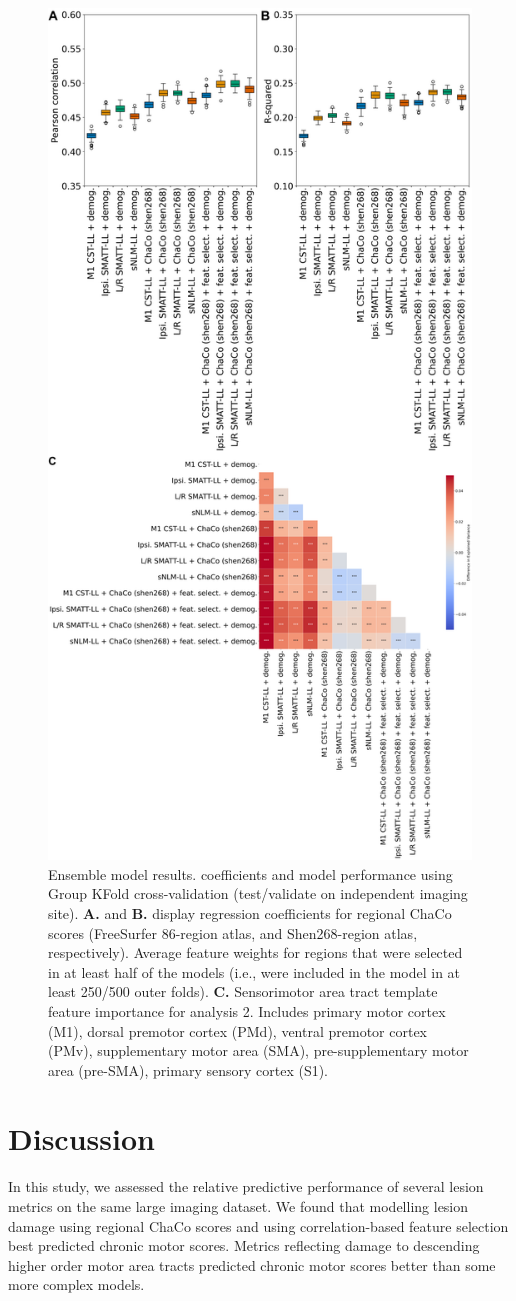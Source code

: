 \documentclass[10pt]{article}
\begin{document}
\begin{figure}[htp]
\centering
\includegraphics[width=0.6\linewidth]{figures/Analysis2.png}
\caption{Ensemble model results. coefficients and model performance using Group KFold cross-validation (test/validate on independent imaging site). \textbf{A.} and \textbf{B.} display regression coefficients for regional ChaCo scores (FreeSurfer 86-region atlas, and Shen268-region atlas, respectively). Average feature weights for regions that were selected in at least half of the models (i.e., were included in the model in at least 250/500 outer folds). \textbf{C.} Sensorimotor area tract template feature importance for analysis 2. Includes primary motor cortex (M1), dorsal premotor cortex (PMd), ventral premotor cortex (PMv), supplementary motor area (SMA), pre-supplementary motor area (pre-SMA), primary sensory cortex (S1).}
\label{nemotool}
\end{figure}

\section{Discussion}
In this study, we assessed the relative predictive performance of several lesion metrics on the same large imaging dataset. We found that modelling lesion damage using regional ChaCo scores and using correlation-based feature selection best predicted chronic motor scores. Metrics reflecting damage to descending higher order motor area tracts predicted chronic motor scores better than some more complex models.
\end{document}
